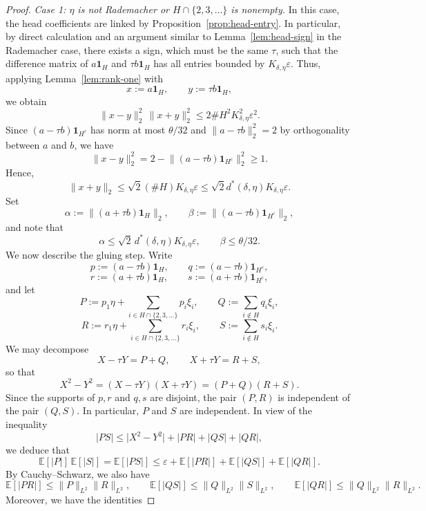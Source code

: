 \documentclass[11pt]{amsart}
\numberwithin{equation}{section}
\theoremstyle{definition}
\theoremstyle{remark}
\newcommand{\E}{\mathbb E}
\newcommand{\eps}{\varepsilon}
\newcommand{\abs}[1]{\lvert #1 \rvert}
\newcommand{\norm}[1]{\lVert #1 \rVert}
\begin{document}
\begin{proof}
\noindent\emph{Case 1: $\eta$ is not Rademacher or $H\cap\{2,3,\dots\}$ is
nonempty.}
In this case, the head coefficients are linked by
Proposition~\ref{prop:head-entry}. %
In particular, by direct calculation and an argument similar to Lemma~\ref{lem:head-sign} in the Rademacher case, 
there exists a sign, which must be the same $\tau$, such that the
difference matrix of $a\mathbf 1_H$ and $\tau b\mathbf 1_H$ has all
entries bounded by $K_{\delta,\eta}\eps$. Thus, applying Lemma~\ref{lem:rank-one} with
\[
x:=a\mathbf 1_H,
\qquad
y:=\tau b\mathbf 1_H,
\]
we obtain 
\[
\norm{x-y}_2^2\,\norm{x+y}_2^2
\le 2\#H^2 K_{\delta,\eta}^2\eps^2.
\]
Since $(a-\tau b)\mathbf{1}_{H^c}$ has norm at most $\theta/32$ and
$\norm{a-\tau b}_2^2=2$ by orthogonality between $a$ and $b$, we have
\[
\norm{x-y}_2^2
=2-\norm{(a-\tau b)\mathbf 1_{H^c}}_2^2
\ge 1.
\]
	Hence,
	\[
	\norm{x+y}_2\le \sqrt{2}(\#H) K_{\delta,\eta}\eps
	\le \sqrt{2}d^*(\delta,\eta)K_{\delta,\eta}\eps.
	\]
	Set
	\[
	\alpha:=\norm{(a+\tau b)\mathbf 1_H}_2,
	\qquad
	\beta:=\norm{(a-\tau b)\mathbf 1_{H^c}}_2,
	\]
	and note that
	\[
	\alpha\le \sqrt2\,d^*(\delta,\eta)K_{\delta,\eta}\eps,
	\qquad
	\beta\le \theta/32.
	\]
	We now describe the gluing step.  Write
	\[
	p:=(a-\tau b)\mathbf 1_H,
	\qquad
	q:=(a-\tau b)\mathbf 1_{H^c},
	\]
	\[
	r:=(a+\tau b)\mathbf 1_H,
	\qquad
	s:=(a+\tau b)\mathbf 1_{H^c},
	\]
	and let
	\[
	P:=p_1\eta+\sum_{i\in H\cap\{2,3,\dots\}} p_i\xi_i,
	\qquad
	Q:=\sum_{i\notin H} q_i\xi_i,
	\]
	\[
	R:=r_1\eta+\sum_{i\in H\cap\{2,3,\dots\}} r_i\xi_i,
	\qquad
	S:=\sum_{i\notin H} s_i\xi_i.
	\]
	We may decompose
	\[
	X-\tau Y=P+Q,
	\qquad
	X+\tau Y=R+S,
	\]
	so that
	\[
	X^2-Y^2
	=(X-\tau Y)(X+\tau Y)
	=(P+Q)(R+S).
	\]
	Since the supports of $p,r$ and $q,s$ are disjoint, the pair $(P,R)$ is
	independent of the pair $(Q,S)$. In particular, $P$ and $S$ are independent.
	In view of the inequality
	\[
	\abs{PS}\le \abs{X^2-Y^2}+\abs{PR}+\abs{QS}+\abs{QR},
	\]
	 we deduce that
	\begin{equation}
    \label{eq:aux_conc_branch}
	\E[\abs{P}]\,\E[\abs{S}]
	=\E[\abs{PS}]
	\le
	\eps+\E[\abs{PR}]+\E[\abs{QS}]+\E[\abs{QR}].
	\end{equation}
	By Cauchy--Schwarz, we also have
	\[
	\E[\abs{PR}]\le \norm{P}_{L^2}\norm{R}_{L^2},
	\qquad
	\E[\abs{QS}]\le \norm{Q}_{L^2}\norm{S}_{L^2},
	\qquad
	\E[\abs{QR}]\le \norm{Q}_{L^2}\norm{R}_{L^2}.
	\]
	Moreover, we have the identities

\end{proof}
\end{document}
